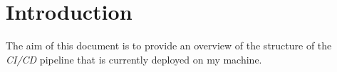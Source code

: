 \section{Introduction}
The aim of this document is to provide an overview of the structure of the \textit{CI/CD} pipeline that is currently deployed on my
machine.
